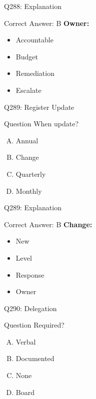 \documentclass{beamer}
\begin{document}
	\begin{frame}{Q288: Explanation}
		\begin{block}{Correct Answer: B}
			\textbf{Owner:}
			\begin{itemize}
				\item Accountable
				\item Budget
				\item Remediation
				\item Escalate
			\end{itemize}
		\end{block}
	\end{frame}
	
	\begin{frame}{Q289: Register Update}
		\begin{block}{Question}
			When update?
		\end{block}
		\begin{enumerate}[(A)]
			\item Annual
			\item Change
			\item Quarterly
			\item Monthly
		\end{enumerate}
	\end{frame}
	
	\begin{frame}{Q289: Explanation}
		\begin{block}{Correct Answer: B}
			\textbf{Change:}
			\begin{itemize}
				\item New
				\item Level
				\item Response
				\item Owner
			\end{itemize}
		\end{block}
	\end{frame}
	
	\begin{frame}{Q290: Delegation}
		\begin{block}{Question}
			Required?
		\end{block}
		\begin{enumerate}[(A)]
			\item Verbal
			\item Documented
			\item None
			\item Board
		\end{enumerate}
	\end{frame}
	
\end{document}
